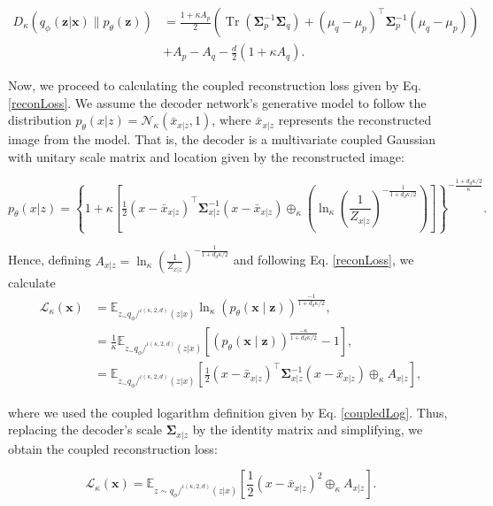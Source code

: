 \documentclass[twoside,11pt]{article}
\renewenvironment{proof}{\par\noindent{\bf Proof\ }}{\hfill\BlackBox\par\vspace{2mm}}
\begin{document}
\begin{proof}
\begin{equation} \label{finalCoupledDivergence}
\begin{split}
     D_{\kappa} \left( q_{\phi}(\mathbf{z}|\mathbf{x}) \big\| p_{\theta}(\mathbf{z}) \right) & =  \frac{1+\kappa A_p}{2}
\left(
\operatorname{Tr}(\boldsymbol{\Sigma}_p^{-1}\boldsymbol{\Sigma}_q)
+
(\mu_q-\mu_p)^\intercal\boldsymbol{\Sigma}_p^{-1}(\mu_q-\mu_p) 
\right) \\
& + A_p - A_q -\frac{d}{2}(1+\kappa A_q).
\end{split}
\end{equation}

Now, we proceed to calculating the coupled reconstruction loss given by Eq. \eqref{reconLoss}. We assume the decoder network's generative model to follow the distribution $p_\theta(x | z) = \mathcal{N}_\kappa(\bar{x}_{x|z}, 1)$, where $\bar{x}_{x|z}$ represents the reconstructed image from the model. That is, the decoder is a multivariate coupled Gaussian with unitary scale matrix and location given by the reconstructed image:

\[
p_\theta(x|z) =  \left \{ 1+\kappa\left[\tfrac{1}{2}(x-\bar{x}_{x|z})^{\intercal}\boldsymbol{\Sigma}_{x|z}^{-1}(x - \bar{x}_{x|z}) \oplus_\kappa \left(\ln_\kappa\left(\frac{1}{Z_{x|z}}\right)^{-\frac{1}{1+d_d\kappa/2}}\right)\right]\right \} ^{-\frac{1+d_d\kappa/2}{\kappa}}.
\]

Hence, defining $A_{x|z} = \ln_\kappa\left(\frac{1}{Z_{x|z}}\right)^{-\frac{1}{1+d_d\kappa/2}}$ and following Eq. \eqref{reconLoss}, we calculate
\begin{align*}
    \mathcal{L}_{\kappa} (\boldsymbol{x}) & =  \mathbb{E}_{z_\sim q_{\phi}/^{\iota(\kappa,2,d)}(z|x)}\ln_\kappa \left(p_{\theta} (\textbf{x}\mid \textbf{z}) \right)^{\frac{-1}{1+d_d\kappa/2}},\\
    &= \frac{1}{\kappa}   \mathbb{E}_{z_\sim q_{\phi}/^{\iota(\kappa,2,d)}(z|x)} \left[ \left(p_{\theta} (\textbf{x}\mid \textbf{z}) \right)^{\frac{-\kappa}{1+d_d\kappa/2}} - 1 \right],\\
   & =  \mathbb{E}_{z_\sim q_{\phi}/^{\iota(\kappa,2,d)}(z|x)}\left[\frac{1}{2}\left(x-\bar{x}_{x|z}\right)^{\intercal}\boldsymbol{\Sigma}_{x|z}^{-1}\left(x-\bar{x}_{x|z}\right) \oplus_{\kappa} A_{x|z}\right],
\end{align*}

where we used the coupled logarithm definition given by Eq. \eqref{coupledLog}. Thus, replacing the decoder's scale $\boldsymbol{\Sigma}_{x|z}$ by the identity matrix and simplifying, we obtain the coupled reconstruction loss:

\begin{equation*}
        \mathcal{L}_{\kappa} (\boldsymbol{x})  = \mathbb{E}_{z\sim q_{\phi}/^{\iota(\kappa,2,d)}(z|x)}\left[\frac{1}{2}\left(x-\bar{x}_{x|z}\right)^2 \oplus_\kappa A_{x|z}\right].
\end{equation*}
\end{proof}
\end{document}
